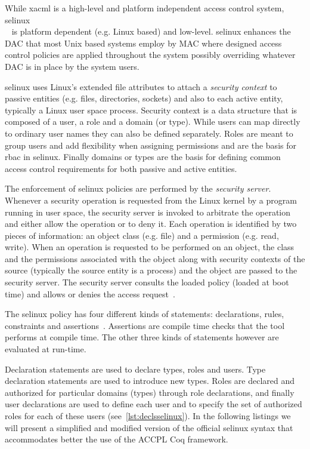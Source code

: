 While \ac{xacml} is a high-level and platform independent access control system, \ac{selinux}\\~\cite{selinux} is platform dependent (e.g. Linux based) and low-level. \ac{selinux} enhances the \ac{DAC} that most Unix based systems employ by \ac{MAC} where designed access control policies are applied throughout the system possibly overriding whatever \ac{DAC} is in place by the system users. 

\ac{selinux} uses Linux's extended file attributes to attach a \emph{security context} to passive entities (e.g. files, directories, sockets) and also to each active entity, typically a Linux user space process. Security context is a data structure that is composed of a user, a role and a domain (or type). While users can map directly to ordinary user names they can also be defined separately. Roles are meant to group users and add flexibility when assigning permissions and are the basis for \ac{rbac} in \ac{selinux}. Finally domains or types are the basis for defining common access control requirements for both passive and active entities. 


The enforcement of \ac{selinux} policies are performed by the \emph{security server}. Whenever a security operation is requested from the Linux kernel by a program running in user space, the security server is invoked to arbitrate the operation and either allow the operation or to deny it. Each operation is identified by two pieces of information: an object class (e.g. file) and a permission (e.g. read, write). When an operation is requested to be performed on an object, the class and the permissions associated with the object along with security contexts of the source (typically the source entity is a process) and the object are passed to the security server. The security server consults the loaded policy (loaded at boot time) and allows or denies the access request~\cite{Sarna}.


The \ac{selinux} policy has four different kinds of statements: declarations, rules, constraints and assertions~\cite{ArcherLP03}. Assertions are compile time checks that the  tool performs at compile time. The other three kinds of statements however are evaluated at run-time. 

Declaration statements are used to declare types, roles and users. Type declaration statements are used to introduce new types. Roles are declared and authorized for particular domains (types) through role declarations, and finally user declarations are used to define each user and to specify the set of authorized roles for each of these users (see~\ref{lst:declsselinux}). In the following listings we will present a simplified and modified version of the official \ac{selinux} syntax that accommodates better the use of the \ac{ACCPL} Coq framework.

